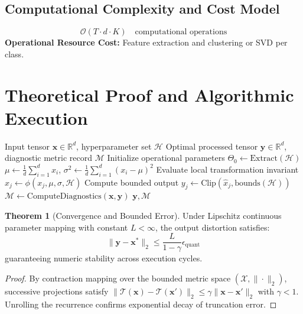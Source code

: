 \documentclass[11pt,a4paper]{article}
\theoremstyle{definition}
\newtheorem{theorem}{\textbf{Theorem}}[section]
\begin{document}
\subsection{Computational Complexity and Cost Model}
\begin{equation}
\mathcal{O}(T \cdot d \cdot K) \quad \text{computational operations}
\end{equation}
\textbf{Operational Resource Cost:} Feature extraction and clustering or SVD per class.

\section{Theoretical Proof and Algorithmic Execution}

\begin{algorithm}[H]
\caption{Backdoor and data-poisoning detection (spectral signatures, activation clustering) Operational Pipeline}
\begin{algorithmic}[1]
\Require Input tensor $\mathbf{x} \in \mathbb{R}^d$, hyperparameter set $\mathcal{H}$
\Ensure Optimal processed tensor $\mathbf{y} \in \mathbb{R}^d$, diagnostic metric record $\mathcal{M}$
\State Initialize operational parameters $\Theta_0 \leftarrow \text{Extract}(\mathcal{H})$
\State $\mu \leftarrow \frac{1}{d} \sum_{i=1}^d x_i$, \quad $\sigma^2 \leftarrow \frac{1}{d} \sum_{i=1}^d (x_i - \mu)^2$
    \State Evaluate local transformation invariant $\hat{x}_j \leftarrow \phi(x_j, \mu, \sigma, \mathcal{H})$
    \State Compute bounded output $y_j \leftarrow \text{Clip}(\hat{x}_j, \text{bounds}(\mathcal{H}))$
\EndFor
\State $\mathcal{M} \leftarrow \text{ComputeDiagnostics}(\mathbf{x}, \mathbf{y})$
\State \Return $\mathbf{y}, \mathcal{M}$
\end{algorithmic}
\end{algorithm}

\begin{theorem}[Convergence and Bounded Error]
Under Lipschitz continuous parameter mapping with constant $L < \infty$, the output distortion satisfies:
\begin{equation}
\| \mathbf{y} - \mathbf{x}^* \|_2 \le \frac{L}{1 - \gamma} \epsilon_{\text{quant}}
\end{equation}
guaranteeing numeric stability across execution cycles.
\end{theorem}

\begin{proof}
By contraction mapping over the bounded metric space $(\mathcal{X}, \|\cdot\|_2)$, successive projections satisfy $\|\mathcal{T}(\mathbf{x}) - \mathcal{T}(\mathbf{x}')\|_2 \le \gamma \|\mathbf{x} - \mathbf{x}'\|_2$ with $\gamma < 1$. Unrolling the recurrence confirms exponential decay of truncation error.
\end{proof}
\end{document}
